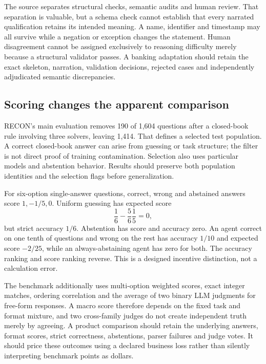 The source separates structural checks, semantic audits and human review.
That separation is valuable, but a schema check cannot establish that every
narrated qualification retains its intended meaning. A name, identifier and
timestamp may all survive while a negation or exception changes the statement.
Human disagreement cannot be assigned exclusively to reasoning difficulty
merely because a structural validator passes. A banking adaptation should
retain the exact skeleton, narration, validation decisions, rejected cases
and independently adjudicated semantic discrepancies.
\citep{exec23_recon_original}

\subsection{Scoring changes the apparent comparison}
RECON's main evaluation removes 190 of 1,604 questions after a closed-book
rule involving three solvers, leaving 1,414. That defines a selected test
population. A correct closed-book answer can arise from guessing or task
structure; the filter is not direct proof of training contamination. Selection
also uses particular models and abstention behavior. Results should preserve
both population identities and the selection flags before generalization.
\citep{exec23_recon_original,exec23_recon_reference}

For six-option single-answer questions, correct, wrong and abstained answers
score $1,-1/5,0$. Uniform guessing has expected score
\[
 \frac16-\frac56\frac15=0,
\]
but strict accuracy $1/6$. Abstention has score and accuracy zero. An agent
correct on one tenth of questions and wrong on the rest has accuracy $1/10$
and expected score $-2/25$, while an always-abstaining agent has zero for
both. The accuracy ranking and score ranking reverse. This is a designed
incentive distinction, not a calculation error. \citep{exec23_recon_reference}

The benchmark additionally uses multi-option weighted scores, exact integer
matches, ordering correlation and the average of two binary LLM judgments for
free-form responses. A macro score therefore depends on the fixed task and
format mixture, and two cross-family judges do not create independent truth
merely by agreeing. A product comparison should retain the underlying answers,
format scores, strict correctness, abstentions, parser failures and judge
votes. It should price these outcomes using a declared business loss rather
than silently interpreting benchmark points as dollars.
\citep{exec23_recon_original}

